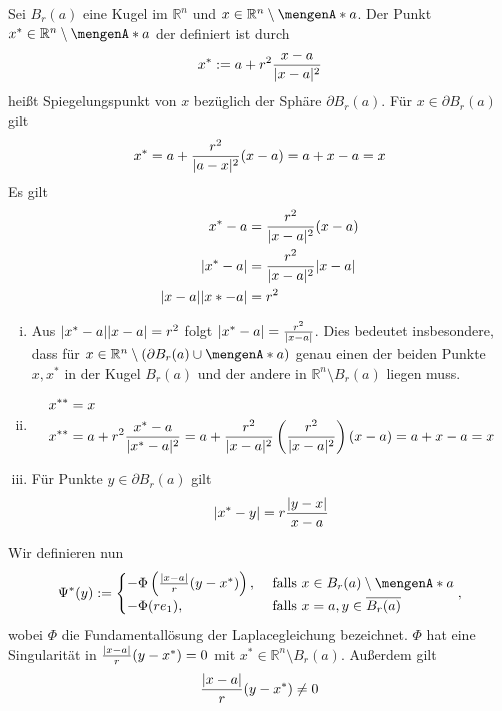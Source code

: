 
\begin{definition}
	Sei $B_r(a)$ eine Kugel im $\mathbb{R}^n$ und $x \in \mathbb{R}^n \setminus \set{a}$. Der Punkt $x^* \in \mathbb{R}^n \setminus \set{a}$ der definiert ist durch
	\[
		x^* := a + r^2 \frac{x-a}{\lvert x-a\rvert^2}
	\]
	heißt Spiegelungspunkt von $x$ bezüglich der Sphäre $ \partial B_r(a)$.
	Für $x \in \partial B_r(a)$ gilt
	\[
		x^* = a + \frac{r^2}{\lvert a-x\rvert^2}(x-a) = a + x -a = x
	\]
	Es gilt
	\begin{align*}
		x^*-a &= \frac{r^2}{\lvert x-a\rvert^2}(x-a) \\
		\lvert x^*-a\rvert &= \frac{r^2}{\lvert x-a\rvert^2}\lvert x-a\rvert \\
		\lvert x-a\rvert\lvert x*-a\rvert &= r^2
	\end{align*}
\end{definition}
\begin{bemerkung}
	\begin{enumerate}[(i)]
		\item Aus $\lvert x^*-a\rvert \lvert x-a\rvert = r^2$ folgt $\lvert x^* -a \rvert = \frac{r^2}{\lvert x-a\rvert}$. 
		Dies bedeutet insbesondere, dass für $x \in  \mathbb{R}^n \setminus \left( \partial B_r(a) \cup \set{a} \right)$ genau einen der beiden Punkte $x,x^*$ 
		in der Kugel $B_r(a)$ und der andere in $\mathbb{R}^n \setminus B_r(a)$ liegen muss.
		\item \begin{align*}
			x^{**} &= x \\
			x^{**} &= a + r^2 \frac{x^* - a}{\lvert x^*-a\rvert^2} = a + \frac{r^2}{\lvert x-a\rvert^2}\left( \frac{r^2}{\lvert x-a\rvert^2} \right)(x-a) = a + x-a =x
		\end{align*}
		\item Für Punkte $y \in \partial B_r(a)$ gilt
		\[
			\lvert x^*-y\rvert = r \frac{\lvert y-x\rvert}{x-a}
		\]
	\end{enumerate}
\end{bemerkung}
Wir definieren nun 
\[
	\Psi^*(y):= \begin{cases}
		- \Phi \left( \frac{\abs{x-a}}{r}(y-x^*) \right), &\text{ falls } x \in B_r(a) \setminus \set{a} \\
		- \Phi (r e_1) , &\text{ falls } x = a, y \in \overline{B_r(a)}
	\end{cases},
\]
wobei $\Phi$ die Fundamentallösung der Laplacegleichung bezeichnet. 
$\Phi$ hat eine Singularität in $ \frac{\lvert x-a\rvert}{r} (y - x^*)= 0$ mit $x^* \in \mathbb{R}^n \setminus B_r(a)$. Außerdem gilt
\[
	\frac{\lvert x-a\rvert}{r}(y- x^*) \neq 0
\]
